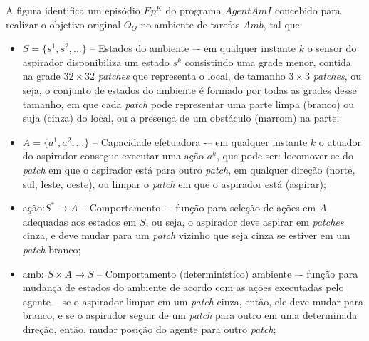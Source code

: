 \begin{figure}[h!]
    \centering
\end{figure}

A figura identifica um episódio $Ep^K$ do programa $AgentAmI$ concebido para realizar o objetivo original $O_O$ no ambiente de tarefas $Amb$, tal que:

\begin{itemize}
    \item $S = \{s^1, s^2, \ldots \}$ -- Estados do ambiente –- em qualquer instante $k$ o sensor do aspirador disponibiliza um estado $s^k$ consistindo uma grade menor, contida na grade $32\times32$ \textit{patches} que representa o local, de tamanho $3\times3$ \textit{patches}, ou seja, o conjunto de estados do ambiente é formado por todas as grades desse tamanho, em que cada \textit{patch} pode representar uma parte limpa (branco) ou suja (cinza) do local, ou a presença de um obstáculo (marrom) na parte;
    
    \item $A = \{a^1, a^2, \ldots \}$ -- Capacidade efetuadora -– em qualquer instante $k$ o atuador do aspirador consegue executar uma ação $a^k$, que pode ser: locomover-se do \textit{patch} em que o aspirador está para outro \textit{patch}, em qualquer direção (norte, sul, leste, oeste), ou limpar o \textit{patch} em que o aspirador está (aspirar);   
    
    \item ação:$S^*  \rightarrow A $ -- Comportamento -– função para seleção de ações em $A$ adequadas aos estados em $S$, ou seja, o aspirador deve aspirar em \textit{patches} cinza, e deve mudar para um \textit{patch} vizinho que seja cinza se estiver em um \textit{patch} branco;
    
    \item amb: $S\times A \rightarrow S$ -- Comportamento (determinístico) ambiente –- função para mudança de estados do ambiente de acordo com as ações executadas pelo agente – se o aspirador limpar em um \textit{patch} cinza, então, ele deve mudar para branco, e se o aspirador seguir de um \textit{patch} para outro em uma determinada direção, então, mudar posição do agente para outro \textit{patch}; 
    

\end{itemize}
